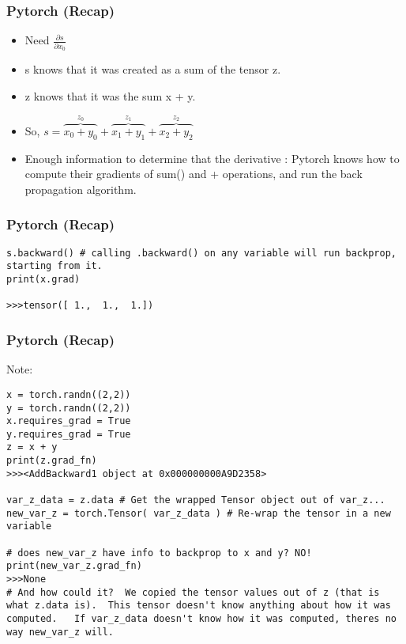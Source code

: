 \begin{frame}[fragile]
\frametitle{Pytorch (Recap)}
\begin{itemize}
\item Need $\frac{\partial s}{\partial x_0}$
\item s knows that it was created as a sum of the tensor z. 
\item z knows that it was the sum x + y. 
\item So, $s = \overbrace{x_0 + y_0}^\text{$z_0$} + \overbrace{x_1 + y_1}^\text{$z_1$} + \overbrace{x_2 + y_2}^\text{$z_2$}$
\item Enough information to determine that the derivative : Pytorch knows how to compute their gradients of sum() and + operations, and run the back propagation algorithm. 
\end{itemize}


\end{frame} 
 
\begin{frame}[fragile]
\frametitle{Pytorch (Recap)}

 \begin{lstlisting}
s.backward() # calling .backward() on any variable will run backprop, starting from it.
print(x.grad)

>>>tensor([ 1.,  1.,  1.])
 \end{lstlisting}

\end{frame} 
 
 
\begin{frame}[fragile]
\frametitle{Pytorch (Recap)}
Note:
 \begin{lstlisting}
x = torch.randn((2,2))
y = torch.randn((2,2))
x.requires_grad = True
y.requires_grad = True
z = x + y 
print(z.grad_fn)
>>><AddBackward1 object at 0x000000000A9D2358>

var_z_data = z.data # Get the wrapped Tensor object out of var_z...
new_var_z = torch.Tensor( var_z_data ) # Re-wrap the tensor in a new variable

# does new_var_z have info to backprop to x and y? NO!
print(new_var_z.grad_fn)
>>>None
# And how could it?  We copied the tensor values out of z (that is what z.data is).  This tensor doesn't know anything about how it was computed.   If var_z_data doesn't know how it was computed, theres no way new_var_z will.
\end{lstlisting}

\end{frame} 
 
